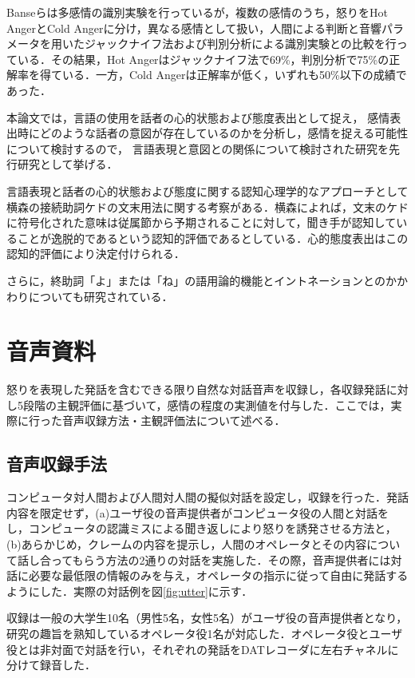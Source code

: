 \documentclass[japanese]{jnlp_1.3c}
\begin{document}
Banseらは多感情の識別実験を行っているが，複数の感情のうち，怒りをHot AngerとCold Angerに分け，異なる感情として扱い，人間による判断と音響パラメータを用いたジャックナイフ法および判別分析による識別実験との比較を行っている\cite{Banse1996}．その結果，Hot Angerはジャックナイフ法で69\%，判別分析で75\%の正解率を得ている．一方，Cold Angerは正解率が低く，いずれも50\%以下の成績であった．

本論文では，言語の使用を話者の心的状態および態度表出として捉え，
感情表出時にどのような話者の意図が存在しているのかを分析し，感情を捉える可能性について検討するので，
言語表現と意図との関係について検討された研究を先行研究として挙げる．

言語表現と話者の心的状態および態度に関する認知心理学的なアプローチとして横森の接続助詞ケドの文末用法に関する考察がある\cite{Yokomori2006}．横森によれば，文末のケドに符号化された意味は従属節から予期されることに対して，聞き手が認知していることが逸脱的であるという認知的評価であるとしている．心的態度表出はこの認知的評価により決定付けられる．

さらに，終助詞「よ」または「ね」の語用論的機能とイントネーションとのかかわりについても研究されている\cite[など]{Katagiri1997,Sugito2001,Inukai2001,Moriyama2001}．

\section{音声資料}
怒りを表現した発話を含むできる限り自然な対話音声を収録し，各収録発話に対し5段階の主観評価に基づいて，感情の程度の実測値を付与した．ここでは，実際に行った音声収録方法・主観評価法について述べる．

\subsection{音声収録手法}
コンピュータ対人間および人間対人間の擬似対話を設定し，収録を行った．発話内容を限定せず，(a)ユーザ役の音声提供者がコンピュータ役の人間と対話をし，コンピュータの認識ミスによる聞き返しにより怒りを誘発させる方法と，(b)あらかじめ，クレームの内容を提示し，人間のオペレータとその内容について話し合ってもらう方法の2通りの対話を実施した．その際，音声提供者には対話に必要な最低限の情報のみを与え，オペレータの指示に従って自由に発話するようにした．実際の対話例を図\ref{fig:utter}に示す．

収録は一般の大学生10名（男性5名，女性5名）がユーザ役の音声提供者となり，研究の趣旨を熟知しているオペレータ役1名が対応した．オペレータ役とユーザ役とは非対面で対話を行い，それぞれの発話をDATレコーダに左右チャネルに分けて録音した．
\end{document}
